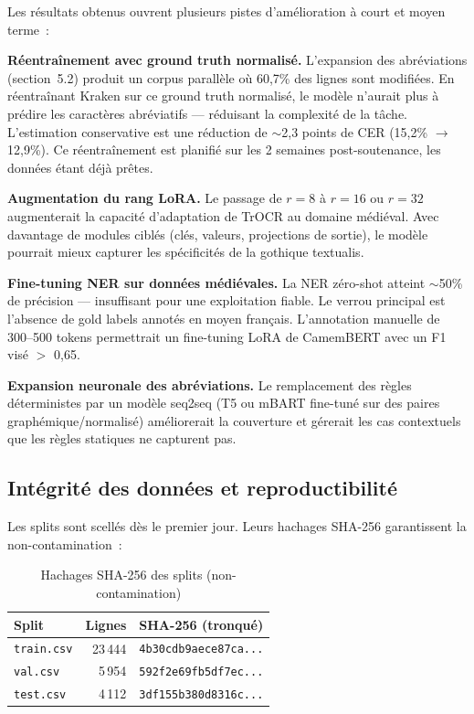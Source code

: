 \documentclass[11pt,a4paper]{article}
\begin{document}
Les résultats obtenus ouvrent plusieurs pistes d'amélioration à court et moyen terme~:

\textbf{Réentraînement avec ground truth normalisé.} L'expansion des abréviations (section~5.2) produit un corpus parallèle où 60,7\% des lignes sont modifiées. En réentraînant Kraken sur ce ground truth normalisé, le modèle n'aurait plus à prédire les caractères abréviatifs --- réduisant la complexité de la tâche. L'estimation conservative est une réduction de $\sim$2,3 points de CER (15,2\% $\rightarrow$ 12,9\%). Ce réentraînement est planifié sur les 2 semaines post-soutenance, les données étant déjà prêtes.

\textbf{Augmentation du rang LoRA.} Le passage de $r=8$ à $r=16$ ou $r=32$ augmenterait la capacité d'adaptation de TrOCR au domaine médiéval. Avec davantage de modules ciblés (clés, valeurs, projections de sortie), le modèle pourrait mieux capturer les spécificités de la gothique textualis.

\textbf{Fine-tuning NER sur données médiévales.} La NER zéro-shot atteint $\sim$50\% de précision --- insuffisant pour une exploitation fiable. Le verrou principal est l'absence de gold labels annotés en moyen français. L'annotation manuelle de 300--500 tokens permettrait un fine-tuning LoRA de CamemBERT avec un F1 visé $>$ 0,65.

\textbf{Expansion neuronale des abréviations.} Le remplacement des règles déterministes par un modèle seq2seq (T5 ou mBART fine-tuné sur des paires graphémique/normalisé) améliorerait la couverture et gérerait les cas contextuels que les règles statiques ne capturent pas.

\subsection{Intégrité des données et reproductibilité}

Les splits sont scellés dès le premier jour. Leurs hachages SHA-256 garantissent la non-contamination~:

\begin{table}[H]
\centering
\caption{Hachages SHA-256 des splits (non-contamination)}
\label{tab:sha256}
\begin{tabular}{@{}lrl@{}}
\toprule
\textbf{Split} & \textbf{Lignes} & \textbf{SHA-256 (tronqué)} \\
\midrule
\texttt{train.csv} & 23\,444 & \texttt{4b30cdb9aece87ca...} \\
\texttt{val.csv} & 5\,954 & \texttt{592f2e69fb5df7ec...} \\
\texttt{test.csv} & 4\,112 & \texttt{3df155b380d8316c...} \\
\bottomrule
\end{tabular}
\end{table}
\end{document}
